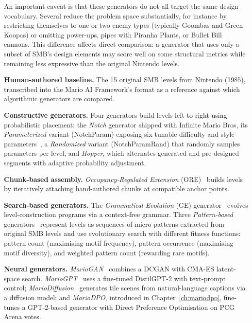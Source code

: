 \documentclass[shortabstract, mgr, english]{iithesis}
\begin{document}
An important caveat is that these generators do not all target the
same design vocabulary. Several reduce the problem space substantially, for
instance by restricting themselves to one or two enemy types (typically Goombas
and Green Koopas) or omitting power-ups, pipes with Piranha Plants, or
Bullet Bill cannons. This difference affects direct comparison: a generator
that uses only a subset of SMB's design elements may score well on
some structural metrics while remaining less expressive than the original
Nintendo levels.

\textbf{Human-authored baseline.} The 15 original SMB levels from Nintendo
(1985), transcribed into the Mario AI Framework's format as a reference
against which algorithmic generators are compared.

\textbf{Constructive generators.} Four generators build levels left-to-right
using probabilistic placement: the \emph{Notch} generator shipped with Infinite
Mario Bros, its \emph{Parameterized} variant (NotchParam) exposing six tunable
difficulty and style parameters~\citep{shaker2011mario}, a \emph{Randomized} variant
(NotchParamRand) that randomly samples parameters per level, and \emph{Hopper},
which alternates generated and pre-designed segments with adaptive probability
adjustment.

\textbf{Chunk-based assembly.} \emph{Occupancy-Regulated Extension}
(ORE)~\citep{mawhorter2010occupancy} builds levels by iteratively attaching
hand-authored chunks at compatible anchor points.

\textbf{Search-based generators.} The \emph{Grammatical Evolution} (GE)
generator~\citep{shaker2012evolving} evolves level-construction programs via a
context-free grammar. Three \emph{Pattern-based}
generators~\citep{dahlskog2014procedural} represent levels as sequences of
micro-patterns extracted from original SMB levels and use evolutionary search
with different fitness functions: pattern count (maximising motif frequency),
pattern occurrence (maximising motif diversity), and weighted pattern count
(rewarding rare motifs).

\textbf{Neural generators.} \emph{MarioGAN}~\citep{volz2018evolving} combines a
DCGAN with CMA-ES latent-space search.
\emph{MarioGPT}~\citep{sudhakaran2023mariogpt} uses a fine-tuned DistilGPT-2
with text-prompt control;
\emph{MarioDiffusion}~\citep{schrum2025mariodiffusion} generates tile scenes from
natural-language captions via a diffusion model; and \emph{MarioDPO}, introduced in Chapter~\ref{ch:mariodpo}, fine-tunes a GPT-2-based generator with Direct Preference
Optimisation on PCG Arena votes.
\end{document}
